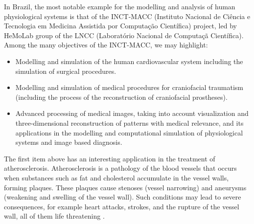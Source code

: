 In Brazil, the most notable example for the modelling and analysis of human physiological systems is that of the INCT-MACC (Instituto Nacional de Ci\^encia e Tecnologia em Medicina Assistida por Computa\c{c}\~ao Cient\'ifica) project, led by HeMoLab group of the LNCC (Laborat\'orio Nacional de Computa\c{c}\~a Cient\'ifica). Among the many objectives of the INCT-MACC, we may highlight: 

\begin{itemize}
\item Modelling and simulation of the human cardiovascular system including the simulation of surgical procedures.
\item Modelling and simulation of medical procedures for craniofacial traumatism (including the process of the reconstruction of craniofacial prostheses).
\item Advanced processing of medical images, taking into account visualization and three-dimensional reconstruction of patterns with medical relevance, and its applications in the modelling and computational simulation of physiological systems and image based diagnosis.
\end{itemize}

The first item above has an interesting application in the treatment of atherosclerosis. Atherosclerosis is a pathology of the blood vessels that occurs when substances such as fat and cholesterol accumulate in the vessel walls, forming plaques. These plaques cause stenoses (vessel narrowing) and aneurysms (weakening and swelling of the vessel wall). Such conditions may lead to severe consequences, for example heart attacks, strokes, and the rupture of the vessel wall, all of them life threatening \citep{Gennest,Libby}.

